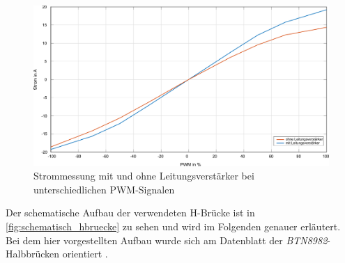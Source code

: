\begin{figure} [H]
	\centering
	\includegraphics[width=0.8\linewidth]{Bilder/Strommessung.pdf}
	\caption{Strommessung mit und ohne Leitungsverstärker bei unterschiedlichen PWM-Signalen}
	\label{fig:Strommessung}
\end{figure}\noindent
Der schematische Aufbau der verwendeten H-Brücke ist in \autoref{fig:schematisch_hbruecke} zu sehen und wird im Folgenden genauer erläutert. Bei dem hier vorgestellten Aufbau wurde sich am Datenblatt der \textit{BTN8982}-Halbbrücken orientiert \cite[S.22]{btn}.

